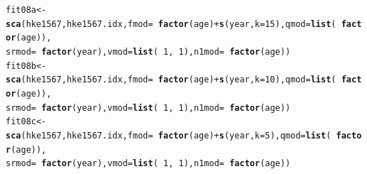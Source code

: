 \documentclass[a4paper,english,11pt]{article}\usepackage[]{graphicx}\usepackage[]{xcolor}
\makeatletter
\newcommand{\hlnum}[1]{\textcolor[rgb]{0.686,0.059,0.569}{#1}}%
\newcommand{\hlopt}[1]{\textcolor[rgb]{0,0,0}{#1}}%
\newcommand{\hldef}[1]{\textcolor[rgb]{0.345,0.345,0.345}{#1}}%
\newcommand{\hlkwb}[1]{\textcolor[rgb]{0.69,0.353,0.396}{#1}}%
\newcommand{\hlkwc}[1]{\textcolor[rgb]{0.333,0.667,0.333}{#1}}%
\newcommand{\hlkwd}[1]{\textcolor[rgb]{0.737,0.353,0.396}{\textbf{#1}}}%
\newenvironment{kframe}{%
 \def\at@end@of@kframe{}%
 \ifinner\ifhmode%
  \def\at@end@of@kframe{\end{minipage}}%
  \begin{minipage}{\columnwidth}%
 \fi\fi%
 \def\FrameCommand##1{\hskip\@totalleftmargin \hskip-\fboxsep
 \colorbox{shadecolor}{##1}\hskip-\fboxsep
     \hskip-\linewidth \hskip-\@totalleftmargin \hskip\columnwidth}%
 \MakeFramed {\advance\hsize-\width
   \@totalleftmargin\z@ \linewidth\hsize
   \@setminipage}}%
 {\par\unskip\endMakeFramed%
 \at@end@of@kframe}
\newenvironment{knitrout}{}{} %
\makeatother
\begin{document}
\begin{knitrout}
\color{fgcolor}\begin{kframe}
\begin{alltt}
\hldef{fit08a} \hlkwb{<-} \hlkwd{sca}\hldef{(hke1567, hke1567.idx,} \hlkwc{fmod} \hldef{=} \hlopt{~}\hlkwd{factor}\hldef{(age)} \hlopt{+} \hlkwd{s}\hldef{(year,} \hlkwc{k} \hldef{=} \hlnum{15}\hldef{),} \hlkwc{qmod} \hldef{=} \hlkwd{list}\hldef{(}\hlopt{~}\hlkwd{factor}\hldef{(age)),}
    \hlkwc{srmod} \hldef{=} \hlopt{~}\hlkwd{factor}\hldef{(year),} \hlkwc{vmod} \hldef{=} \hlkwd{list}\hldef{(}\hlopt{~}\hlnum{1}\hldef{,} \hlopt{~}\hlnum{1}\hldef{),} \hlkwc{n1mod} \hldef{=} \hlopt{~}\hlkwd{factor}\hldef{(age))}
\hldef{fit08b} \hlkwb{<-} \hlkwd{sca}\hldef{(hke1567, hke1567.idx,} \hlkwc{fmod} \hldef{=} \hlopt{~}\hlkwd{factor}\hldef{(age)} \hlopt{+} \hlkwd{s}\hldef{(year,} \hlkwc{k} \hldef{=} \hlnum{10}\hldef{),} \hlkwc{qmod} \hldef{=} \hlkwd{list}\hldef{(}\hlopt{~}\hlkwd{factor}\hldef{(age)),}
    \hlkwc{srmod} \hldef{=} \hlopt{~}\hlkwd{factor}\hldef{(year),} \hlkwc{vmod} \hldef{=} \hlkwd{list}\hldef{(}\hlopt{~}\hlnum{1}\hldef{,} \hlopt{~}\hlnum{1}\hldef{),} \hlkwc{n1mod} \hldef{=} \hlopt{~}\hlkwd{factor}\hldef{(age))}
\hldef{fit08c} \hlkwb{<-} \hlkwd{sca}\hldef{(hke1567, hke1567.idx,} \hlkwc{fmod} \hldef{=} \hlopt{~}\hlkwd{factor}\hldef{(age)} \hlopt{+} \hlkwd{s}\hldef{(year,} \hlkwc{k} \hldef{=} \hlnum{5}\hldef{),} \hlkwc{qmod} \hldef{=} \hlkwd{list}\hldef{(}\hlopt{~}\hlkwd{factor}\hldef{(age)),}
    \hlkwc{srmod} \hldef{=} \hlopt{~}\hlkwd{factor}\hldef{(year),} \hlkwc{vmod} \hldef{=} \hlkwd{list}\hldef{(}\hlopt{~}\hlnum{1}\hldef{,} \hlopt{~}\hlnum{1}\hldef{),} \hlkwc{n1mod} \hldef{=} \hlopt{~}\hlkwd{factor}\hldef{(age))}


\end{alltt}
\end{kframe}
\end{knitrout}
\end{document}
